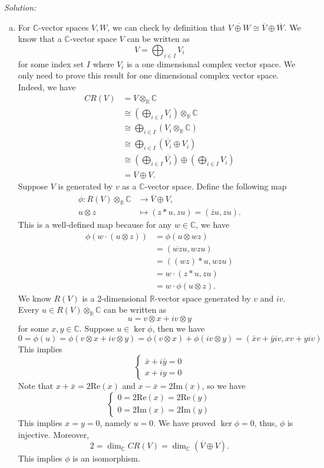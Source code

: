 \documentclass[a4paper, 12pt]{article}
\newenvironment{solution}
    {\textit{Solution:}}
    {}
\newcommand{\cRe}{\text{Re}}
\newcommand{\cIm}{\text{Im}}
\begin{document}
\begin{solution}
\begin{enumerate}[(a)]
\item For \(\mathbb{C}\)-vector spaces \(V,W\), we can check by definition that \(\overline{V\oplus W}\cong \overline{V}\oplus \overline{W}\). We know that a \(\mathbb{C}\)-vector space \(V\) can be written as 
\[V=\bigoplus_{i\in I}V_i\]
for some index set \(I\) where \(V_i\) is a one dimensional complex vector space. We only need to prove this result for one dimensional complex vector space. Indeed, we have 
\begin{align*}
    CR(V)&= V\otimes_\mathbb{R}\mathbb{C}\\ 
         &\cong (\bigoplus_{i\in I}V_i)\otimes_\mathbb{R}\mathbb{C}\\ 
         &\cong\bigoplus_{i\in I}(V_i\otimes_\mathbb{R}\mathbb{C})\\ 
         &\cong\bigoplus_{i\in I}(\overline{V_i}\oplus V_i)\\ 
         &\cong(\bigoplus_{i\in I}\overline{V_i})\oplus (\bigoplus_{i\in I}V_i)\\ 
         &=\overline{V}\oplus V.
\end{align*}
Suppose \(V\) is generated by \(v\) as a \(\mathbb{C}\)-vector space. Define the following map 
\begin{align*}
    \phi:R(V)\otimes_\mathbb{R}\mathbb{C}&\rightarrow \overline{V}\oplus V,\\ 
         u\otimes z&\mapsto (z*u,zu)=(\bar{z}u,zu).
\end{align*}
This is a well-defined map because for any \(w\in \mathbb{C}\), we have 
\begin{align*}
    \phi(w\cdot (u\otimes z))&=\phi(u\otimes wz)\\ 
                             &=(\overline{wz}u,wzu)\\ 
                             &=((wz)*u,wzu)\\ 
                             &=w\cdot (z*u,zu)\\ 
                             &=w\cdot \phi(u\otimes z).
\end{align*}
We know \(R(V)\) is a 2-dimensional \(\mathbb{R}\)-vector space generated by \(v\) and \(iv\). Every \(u\in R(V)\otimes_\mathbb{R}\mathbb{C}\) can be written as 
\[u=v\otimes x+iv\otimes y\]
for some \(x,y\in \mathbb{C}\). Suppose \(u\in \ker \phi\), then we have 
\[0=\phi(u)=\phi(v\otimes x+iv\otimes y)=\phi(v\otimes x)+\phi(iv\otimes y)=(\bar{x}v+\bar{y}iv,xv+yiv)\]
This implies 
\[\begin{cases}
    \bar{x}+i\bar{y}=0\\ 
    x+iy=0
\end{cases}\]
Note that \(x+\bar{x}=2\cRe(x)\) and \(x-\bar{x}=2\cIm(x)\), so we have 
\[\begin{cases}
    0=2\cRe(x)=2\cRe(y)\\ 
    0=2\cIm(x)=2\cIm(y)
\end{cases}\]
This implies \(x=y=0\), namely \(u=0\). We have proved \(\ker \phi=0\), thus, \(\phi\) is injective. Moreover, 
\[2=\dim_\mathbb{C}CR(V)=\dim_\mathbb{C}(\overline{V}\oplus V).\]
This implies \(\phi\) is an isomorphism. 
\end{enumerate}
\end{solution}
\end{document}
